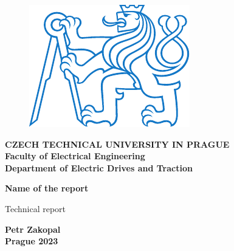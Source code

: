 \documentclass[a4paper, twoside, 11pt]{article}
\begin{document}
\setcounter{figure}{0}

\begin{titlepage}
	\begin{center}

\begin{figure}[H]
	\begin{center}
		\includegraphics[scale=1]{src/misc/symbol_cvut_konturova_verze.pdf}
	\end{center}
\end{figure}
	{\Large{\textbf{CZECH TECHNICAL UNIVERSITY IN PRAGUE}}}\\
	{\textbf{Faculty of Electrical Engineering}}\\
	{\textbf{Department of Electric Drives and Traction}}
	
	\vspace{3cm}
	
	
	{\Large\textbf{Name of the report}}
	
	\vspace{1cm}
	
	
	
	Technical report\\
	
	\end{center}
	
	\vspace{3cm}
	
	
	\vspace{0.5cm}
	
	\vfill
	
\begin{center}

	\large{\textbf{Petr Zakopal}}\\
	\large{\textbf{Prague 2023}}
	\end{center}
\end{titlepage}
\end{document}
